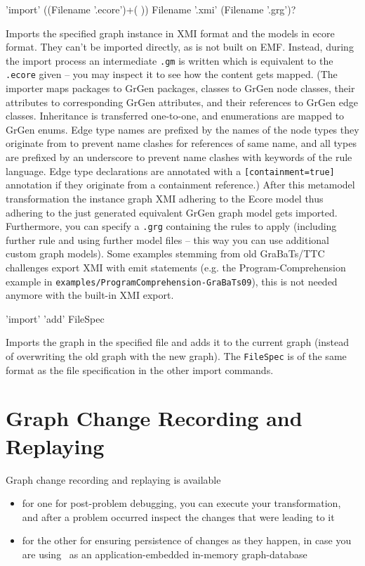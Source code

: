 \begin{rail}
  'import' ((Filename '.ecore')+( )) Filename '.xmi' (Filename '.grg')?
\end{rail}\label{shellecoreexport}
Imports the specified graph instance in XMI format and the models in ecore format.
They can't be imported directly, as \GrG{ } is not built on EMF.
Instead, during the import process an intermediate \texttt{.gm} is written which is equivalent to the \texttt{.ecore} given -- you may inspect it to see how the content gets mapped.
(The importer maps packages to GrGen packages, classes to GrGen node classes, their attributes to corresponding GrGen attributes, and their references to GrGen edge classes.
Inheritance is transferred one-to-one, and enumerations are mapped to GrGen enums.
Edge type names are prefixed by the names of the node types they originate from to prevent name clashes for references of same name,
and all types are prefixed by an underscore to prevent name clashes with keywords of the rule language.
Edge type declarations are annotated with a \verb#[containment=true]# annotation if they originate from a containment reference.)
After this metamodel transformation the instance graph XMI adhering to the Ecore model thus adhering to the just
generated equivalent GrGen graph model gets imported.
Furthermore, you can specify a \texttt{.grg} containing the rules to apply (including further rule and using further model files -- this way you can use additional custom graph models).
Some examples stemming from old GraBaTs/TTC challenges export XMI with emit statements (e.g. the Program-Comprehension example in \texttt{examples/ProgramComprehension-GraBaTs09}), this is not needed anymore with the built-in XMI export.

\begin{rail}
  'import' 'add' FileSpec
\end{rail}
Imports the graph in the specified file and adds it to the current graph
(instead of overwriting the old graph with the new graph).
The \texttt{FileSpec} is of the same format as the file specification in the other import commands.


\section{Graph Change Recording and Replaying}
\label{recordnreplay}

Graph change recording and replaying is available 
\begin{itemize}
	\item for one for post-problem debugging, you can execute your transformation, and after a problem occurred inspect the changes that were leading to it
	\item for the other for ensuring persistence of changes as they happen, in case you are using \GrG\ as an application-embedded in-memory graph-database
\end{itemize}

